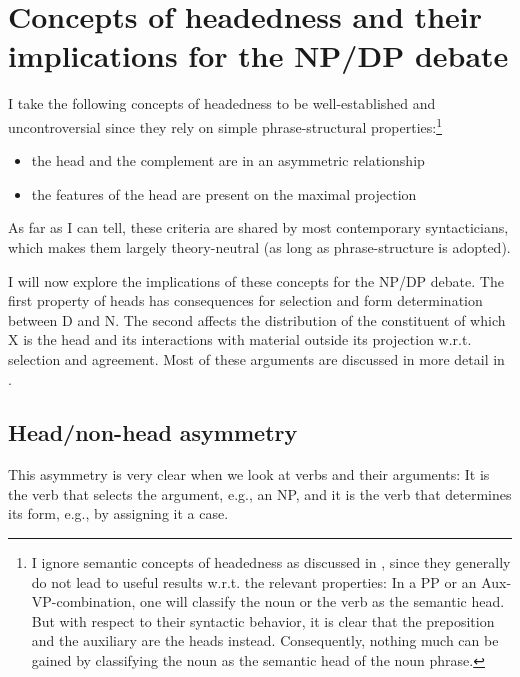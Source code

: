 \documentclass[output=paper,colorlinks,citecolor=black,
]{langscibook}
\begin{document}
\section{Concepts of headedness and their implications for the NP/DP debate}
\label{sec-headedness}

I take the following concepts of headedness to be well-established and uncontroversial since they rely on simple phrase-structural properties:\footnote{I ignore semantic concepts of headedness as discussed in \citet{Zwicky:1985:heads}, since they generally do not lead to useful results w.r.t. the relevant properties: In a PP or an Aux-VP-combination, one will classify the noun or the verb as the semantic head. But with respect to their syntactic behavior, it is clear that the preposition and the auxiliary are the heads instead. Consequently, nothing much can be gained by classifying the noun as the semantic head of the noun phrase.}

\begin{itemize}
	\item the head and the complement are in an asymmetric relationship %
	

	\item the features of the head are present on the maximal projection 
\end{itemize}\vspace*{0.2cm}

As far as I can tell, these criteria are shared by most contemporary syntacticians, which makes them largely theory-neutral (as long as phrase-structure is adopted).

I will now explore the implications of these concepts for the NP/DP debate. The first property of heads has consequences for selection and form determination between D and N. The second affects the distribution of the constituent of which X is the head and its interactions with material outside its projection w.r.t. selection and agreement. Most of these arguments are discussed in more detail in \citet{Salzmann:2020:NP-DP}.

\subsection{Head/non-head asymmetry}

This asymmetry is very clear when we look at verbs and their arguments: It is the verb that selects the argument, e.g., an NP, and it is the verb that determines its form, e.g., by assigning it a case.
\end{document}
